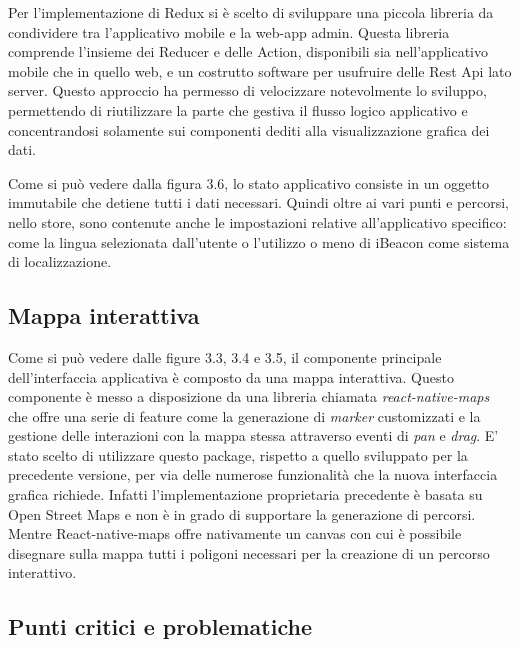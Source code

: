 Per l'implementazione di Redux si è scelto di sviluppare una piccola libreria da condividere tra l'applicativo mobile e la web-app admin. Questa libreria comprende l'insieme dei Reducer e delle Action, disponibili sia nell'applicativo mobile che in quello web, e un costrutto software per usufruire delle Rest Api lato server. Questo approccio ha permesso di velocizzare notevolmente lo sviluppo, permettendo di riutilizzare la parte che gestiva il flusso logico applicativo e concentrandosi solamente sui componenti dediti alla visualizzazione grafica dei dati.\vspace{5mm}

Come si può vedere dalla figura 3.6, lo stato applicativo consiste in un oggetto immutabile che detiene tutti i dati necessari. Quindi oltre ai vari punti e percorsi, nello store, sono contenute anche le impostazioni relative all'applicativo specifico: come la lingua selezionata dall'utente o l'utilizzo o meno di iBeacon come sistema di localizzazione.\vspace{5mm}

\subsection{Mappa interattiva}\vspace{5mm}

Come si può vedere dalle figure 3.3, 3.4 e 3.5, il componente principale dell'interfaccia applicativa è composto da una mappa interattiva. Questo componente è messo a disposizione da una libreria chiamata \emph{react-native-maps} che offre una serie di feature come la generazione di \emph{marker} customizzati e la gestione delle interazioni con la mappa stessa attraverso eventi di \emph{pan} e \emph{drag}. E' stato scelto di utilizzare questo package, rispetto a quello sviluppato per la precedente versione, per via delle numerose funzionalità che la nuova interfaccia grafica richiede. Infatti l'implementazione proprietaria precedente è basata su Open Street Maps e non è in grado di supportare la generazione di percorsi. Mentre React-native-maps offre nativamente un canvas con cui è possibile disegnare sulla mappa tutti i poligoni necessari per la creazione di un percorso interattivo. \vspace{5mm}

\subsection{Punti critici e problematiche}\vspace{5mm}

